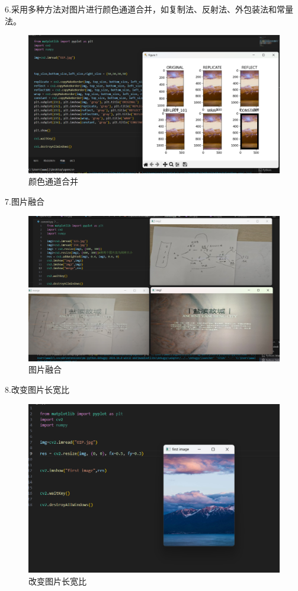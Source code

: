 \documentclass[a4paper, 12pt]{article}
\begin{document}
6.采用多种方法对图片进行颜色通道合并，如复制法、反射法、外包装法和常量法。
\begin{figure}[H]
  \centering
  \includegraphics[width=1\textwidth]{屏幕截图 2024-09-12 171721.png}
  \caption{颜色通道合并}
    \end{figure}

7.图片融合
\begin{figure}[H]
  \centering
  \includegraphics[width=1\textwidth]{屏幕截图 2024-09-12 191350.png}
  \caption{图片融合}
    \end{figure}



8.改变图片长宽比
\begin{figure}[H]
  \centering
  \includegraphics[width=1\textwidth]{屏幕截图 2024-09-12 192504.png}
  \caption{改变图片长宽比}
    \end{figure}
\end{document}
